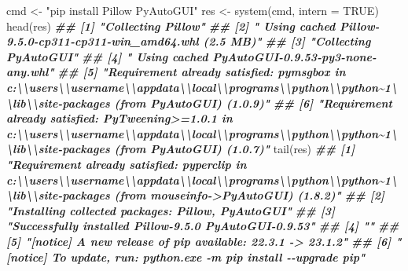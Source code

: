 \documentclass[
]{article}
\newenvironment{Shaded}{\begin{snugshade}}{\end{snugshade}}
\newcommand{\AttributeTok}[1]{\textcolor[rgb]{0.77,0.63,0.00}{#1}}
\newcommand{\ConstantTok}[1]{\textcolor[rgb]{0.00,0.00,0.00}{#1}}
\newcommand{\DocumentationTok}[1]{\textcolor[rgb]{0.56,0.35,0.01}{\textbf{\textit{#1}}}}
\newcommand{\FunctionTok}[1]{\textcolor[rgb]{0.00,0.00,0.00}{#1}}
\newcommand{\NormalTok}[1]{#1}
\newcommand{\OtherTok}[1]{\textcolor[rgb]{0.56,0.35,0.01}{#1}}
\newcommand{\StringTok}[1]{\textcolor[rgb]{0.31,0.60,0.02}{#1}}
\begin{document}
\begin{Shaded}
\begin{Highlighting}[]
\NormalTok{cmd }\OtherTok{\textless{}{-}} \StringTok{"pip install Pillow PyAutoGUI"}
\NormalTok{res }\OtherTok{\textless{}{-}} \FunctionTok{system}\NormalTok{(cmd, }\AttributeTok{intern =} \ConstantTok{TRUE}\NormalTok{)}
\FunctionTok{head}\NormalTok{(res)}
\DocumentationTok{\#\# [1] "Collecting Pillow"}
\DocumentationTok{\#\# [2] "  Using cached Pillow{-}9.5.0{-}cp311{-}cp311{-}win\_amd64.whl (2.5 MB)"}
\DocumentationTok{\#\# [3] "Collecting PyAutoGUI"}
\DocumentationTok{\#\# [4] "  Using cached PyAutoGUI{-}0.9.53{-}py3{-}none{-}any.whl"}
\DocumentationTok{\#\# [5] "Requirement already satisfied: pymsgbox in c:\textbackslash{}\textbackslash{}users\textbackslash{}\textbackslash{}username\textbackslash{}\textbackslash{}appdata\textbackslash{}\textbackslash{}local\textbackslash{}\textbackslash{}programs\textbackslash{}\textbackslash{}python\textbackslash{}\textbackslash{}python\textasciitilde{}1\textbackslash{}\textbackslash{}lib\textbackslash{}\textbackslash{}site{-}packages (from PyAutoGUI) (1.0.9)"}
\DocumentationTok{\#\# [6] "Requirement already satisfied: PyTweening\textgreater{}=1.0.1 in c:\textbackslash{}\textbackslash{}users\textbackslash{}\textbackslash{}username\textbackslash{}\textbackslash{}appdata\textbackslash{}\textbackslash{}local\textbackslash{}\textbackslash{}programs\textbackslash{}\textbackslash{}python\textbackslash{}\textbackslash{}python\textasciitilde{}1\textbackslash{}\textbackslash{}lib\textbackslash{}\textbackslash{}site{-}packages (from PyAutoGUI) (1.0.7)"}
\FunctionTok{tail}\NormalTok{(res)}
\DocumentationTok{\#\# [1] "Requirement already satisfied: pyperclip in c:\textbackslash{}\textbackslash{}users\textbackslash{}\textbackslash{}username\textbackslash{}\textbackslash{}appdata\textbackslash{}\textbackslash{}local\textbackslash{}\textbackslash{}programs\textbackslash{}\textbackslash{}python\textbackslash{}\textbackslash{}python\textasciitilde{}1\textbackslash{}\textbackslash{}lib\textbackslash{}\textbackslash{}site{-}packages (from mouseinfo{-}\textgreater{}PyAutoGUI) (1.8.2)"}
\DocumentationTok{\#\# [2] "Installing collected packages: Pillow, PyAutoGUI"}
\DocumentationTok{\#\# [3] "Successfully installed Pillow{-}9.5.0 PyAutoGUI{-}0.9.53"}
\DocumentationTok{\#\# [4] ""}
\DocumentationTok{\#\# [5] "[notice] A new release of pip available: 22.3.1 {-}\textgreater{} 23.1.2"}
\DocumentationTok{\#\# [6] "[notice] To update, run: python.exe {-}m pip install {-}{-}upgrade pip"}
\end{Highlighting}
\end{Shaded}
\end{document}
